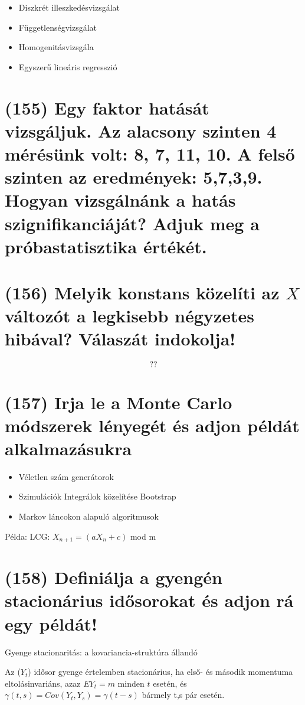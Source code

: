 \documentclass[12p]{article}
\begin{document}
\begin{itemize}
	\item Diszkrét illeszkedésvizsgálat
	\item Függetlenségvizsgálat
	\item Homogenitásvizsgála
	\item Egyszerű lineáris regresszió
\end{itemize}

\section{(155) Egy faktor hatását vizsgáljuk. Az alacsony szinten 4 mérésünk volt: 8, 7, 11, 10. A felső
szinten az eredmények: 5,7,3,9. Hogyan vizsgálnánk a hatás szignifikanciáját? Adjuk meg
a próbastatisztika értékét.}

\section{(156) Melyik konstans közelíti az $X$ változót a legkisebb négyzetes hibával? Válaszát indokolja!}

$$??$$

\section{(157)  Irja le a Monte Carlo módszerek lényegét és adjon példát alkalmazásukra}

\begin{itemize}
	\item Véletlen szám generátorok
	\item Szimulációk
	\subitem Integrálok közelítése
	\subitem Bootstrap
	\item Markov láncokon alapuló algoritmusok
\end{itemize}

Példa: LCG: $X_{n+1} = (aX_n + c)$ mod m

\section{(158) Definiálja a gyengén stacionárius idősorokat és adjon rá egy példát!}

Gyenge stacionaritás: a kovariancia-struktúra állandó

Az ($Y_t$) idősor gyenge értelemben stacionárius, ha első- és második momentuma eltolásinvariáns, azaz $EY_t = m$ minden $t$ esetén, és $\gamma(t,s) = Cov(Y_t, Y_s) = \gamma(t - s)$ bármely t,s pár esetén.
\end{document}
